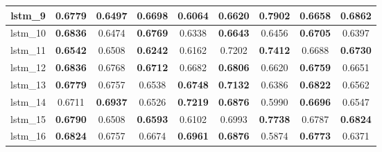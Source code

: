 \begin{table}[p]
\begin{tabular}{|c|c|c|c|c|c|c|c|c|}
        lstm\_9  & \textbf{0.6779}                     & 0.6497                              & \textbf{0.6698}                     & 0.6064                              & 0.6620                              & \textbf{\cellcolor{green!50}0.7902} & 0.6658                              & \textbf{0.6862}                     \\ \hline
        lstm\_10 & \textbf{0.6836}                     & 0.6474                              & \textbf{0.6769}                     & 0.6338                              & \textbf{0.6643}                     & 0.6456                              & \textbf{0.6705}                     & 0.6397                              \\ \hline
        lstm\_11 & \textbf{0.6542}                     & 0.6508                              & \textbf{0.6242}                     & 0.6162                              & 0.7202                              & \textbf{0.7412}                     & 0.6688                              & \textbf{0.6730}                     \\ \hline
        lstm\_12 & \textbf{0.6836}                     & 0.6768                              & \textbf{0.6712}                     & 0.6682                              & \textbf{0.6806}                     & 0.6620                              & \textbf{0.6759}                     & 0.6651                              \\ \hline
        lstm\_13 & \textbf{0.6779}                     & 0.6757                              & 0.6538                              & \textbf{0.6748}                     & \textbf{0.7132}                     & 0.6386                              & \textbf{0.6822}                     & 0.6562                              \\ \hline
        lstm\_14 & 0.6711                              & \textbf{\cellcolor{green!50}0.6937} & 0.6526                              & \textbf{\cellcolor{green!50}0.7219} & \textbf{0.6876}                     & 0.5990                              & \textbf{0.6696}                     & 0.6547                              \\ \hline
        lstm\_15 & \textbf{0.6790}                     & 0.6508                              & \textbf{0.6593}                     & 0.6102                              & 0.6993                              & \textbf{0.7738}                     & 0.6787                              & \textbf{0.6824}                     \\ \hline
        lstm\_16 & \textbf{0.6824}                     & 0.6757                              & 0.6674                              & \textbf{0.6961}                     & \textbf{0.6876}                     & 0.5874                              & \textbf{0.6773}                     & 0.6371                              \\ \hline

\end{tabular}
\end{table}
